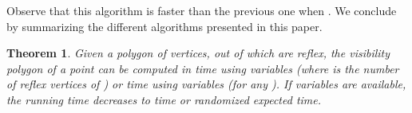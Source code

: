 \documentclass[a4paper]{article}
\newtheorem{theorem}{Theorem}
\begin{document}
Observe that this algorithm is faster than the previous one when .
We conclude by summarizing the different algorithms presented in this paper. 

\begin{theorem}
Given a polygon  of  vertices, out of which  are reflex, the visibility polygon of a point  can be computed in  time using  variables (where  is the number of reflex vertices of ) or  time using  variables (for any ). If  variables are available, the running time decreases to  time or  randomized expected time.
\end{theorem}








 








\end{document}
